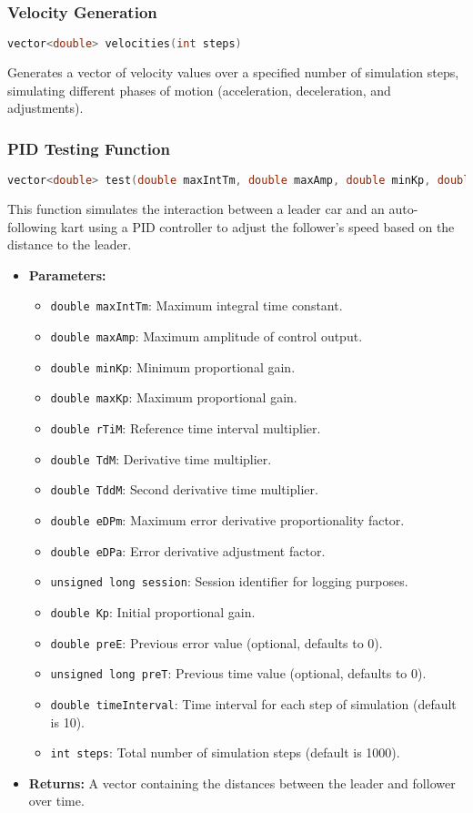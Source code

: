 \documentclass[a4paper,12pt]{report}
\begin{document}
\subsubsection{Velocity Generation}
\begin{lstlisting}[language=cpp]
vector<double> velocities(int steps)
\end{lstlisting}
Generates a vector of velocity values over a specified number of simulation steps, simulating different phases of motion (acceleration, deceleration, and adjustments).
\subsubsection{PID Testing Function}
\begin{lstlisting}[language=cpp]
vector<double> test(double maxIntTm, double maxAmp, double minKp, double maxKp, double rTiM, double TdM, double TddM, double eDPm, double eDPa, unsigned long session, double Kp, double preE = 0, unsigned long preT = 0, double timeInterval = 10, int steps = 1000)
\end{lstlisting}
This function simulates the interaction between a leader car and an auto-following kart using a PID controller to adjust the follower's speed based on the distance to the leader.
\begin{itemize}
\item \textbf{Parameters:}
\begin{itemize}
\item \texttt{double maxIntTm}: Maximum integral time constant.
\item \texttt{double maxAmp}: Maximum amplitude of control output.
\item \texttt{double minKp}: Minimum proportional gain.
\item \texttt{double maxKp}: Maximum proportional gain.
\item \texttt{double rTiM}: Reference time interval multiplier.
\item \texttt{double TdM}: Derivative time multiplier.
\item \texttt{double TddM}: Second derivative time multiplier.
\item \texttt{double eDPm}: Maximum error derivative proportionality factor.
\item \texttt{double eDPa}: Error derivative adjustment factor.
\item \texttt{unsigned long session}: Session identifier for logging purposes.
\item \texttt{double Kp}: Initial proportional gain.
\item \texttt{double preE}: Previous error value (optional, defaults to 0).
\item \texttt{unsigned long preT}: Previous time value (optional, defaults to 0).
\item \texttt{double timeInterval}: Time interval for each step of simulation (default is 10).
\item \texttt{int steps}: Total number of simulation steps (default is 1000).
\end{itemize}
\item \textbf{Returns:} A vector containing the distances between the leader and follower over time.
\end{itemize}
\end{document}

